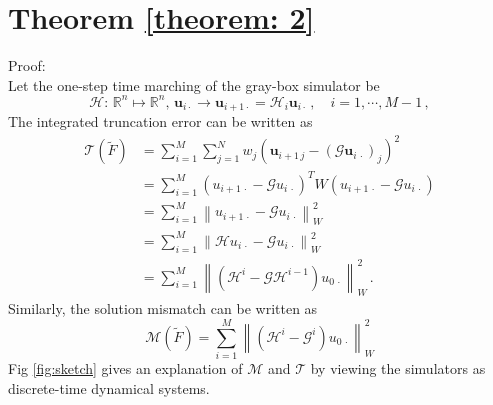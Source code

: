 \section{Theorem \ref{theorem: 2}}
\label{proof 2}
Proof: \\
Let the one-step time marching of the gray-box simulator be
\begin{equation*}
    \mathcal{H}:\, \mathbb{R}^n\mapsto\mathbb{R}^n,\, 
    \boldsymbol{u}_{i\cdot}
    \rightarrow 
    \boldsymbol{u}_{i+1\cdot} = \mathcal{H}_i\boldsymbol{u}_{i\cdot} \,,
    \quad i=1,\cdots, M-1\,,
\end{equation*}
The integrated truncation error can be written as
\begin{equation*}\begin{split}
    \mathcal{T}(\tilde{F}) &= 
        \sum_{i=1}^M \sum_{j=1}^N w_{j} \left(
        \boldsymbol{u}_{i+1\, j} - (\mathcal{G}\boldsymbol{u}_{i\, \cdot})_j
        \right)^2\\
    &= \sum_{i=1}^M (u_{i+1\,\cdot} - \mathcal{G} u_{i\,\cdot})^T W
                    (u_{i+1\,\cdot} - \mathcal{G} u_{i\,\cdot}) \\
    &= \sum_{i=1}^M \left\|u_{i+1\,\cdot} - \mathcal{G} u_{i\,\cdot}\right\|^2_{W}\\
    &= \sum_{i=1}^M \left\| \mathcal{H} u_{i\, \cdot} - \mathcal{G} u_{i\,\cdot} \right\|^2_{W}\\
    &= \sum_{i=1}^M \left\| \left(\mathcal{H}^i - \mathcal{G} \mathcal{H}^{i-1}\right)
       u_{0\,\cdot} \right\|^2_{W}\,.
\end{split}\end{equation*}
Similarly, the solution mismatch can be written as
\begin{equation*}
    \mathcal{M}(\tilde{F}) = \sum_{i=1}^M \left\| 
    \left(\mathcal{H}^i - \mathcal{G}^i\right)
    u_{0\,\cdot} \right\|^2_{W}
\end{equation*}
Fig \ref{fig:sketch} gives an explanation of $\mathcal{M}$ and $\mathcal{T}$ by viewing 
the simulators as discrete-time dynamical systems.\\

